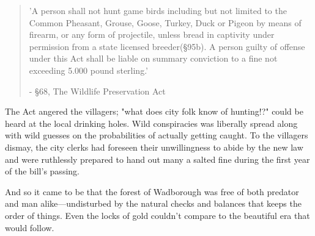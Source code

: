 \begin{localsize}{10}
	\begin{quote}
		'A person shall not hunt game birds including but not limited to the Common Pheasant, Grouse, Goose, Turkey, Duck or Pigeon by means of firearm, or any form of projectile, unless bread in captivity under permission from a state licensed breeder(§95b). A person guilty of offense under this Act shall be liable on summary conviction to a fine not exceeding 5.000 pound sterling.'
		\begin{flushright}- §68, The Wildlife Preservation Act\end{flushright}
	\end{quote} 
\end{localsize}
 
The Act angered the villagers; "what does city folk know of hunting!?" could be heard at the local drinking holes. Wild conspiracies was liberally spread along with wild guesses on the probabilities of actually getting caught. To the villagers dismay, the city clerks had foreseen their unwillingness to abide by the new law and were ruthlessly prepared to hand out many a salted fine during the first year of the bill's passing. 

And so it came to be that the forest of Wadborough was free of both predator and man alike---undisturbed by the natural checks and balances that keeps the order of things. Even the locks of gold couldn't compare to the beautiful era that would follow.


